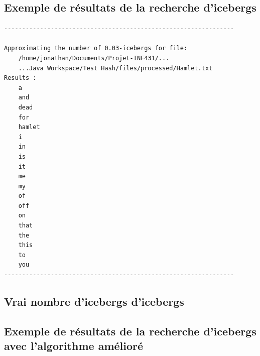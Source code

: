 \documentclass[12pt,a4paper,titlepage]{article}
\begin{document}
\subsection*{Exemple de résultats de la recherche d'icebergs}
\label{exemple:icebergs}

\begin{verbatim}
----------------------------------------------------------------

Approximating the number of 0.03-icebergs for file:
	/home/jonathan/Documents/Projet-INF431/...
	...Java Workspace/Test Hash/files/processed/Hamlet.txt
Results :
	a
	and
	dead
	for
	hamlet
	i
	in
	is
	it
	me
	my
	of
	off
	on
	that
	the
	this
	to
	you
----------------------------------------------------------------
\end{verbatim}

\subsection*{Vrai nombre d'icebergs d'icebergs}
\label{exemple:icebergsBenchmark}

\subsection*{Exemple de résultats de la recherche d'icebergs avec l'algorithme amélioré}
\label{exemple:icebergsImproved}
 
 
 
\end{document}
